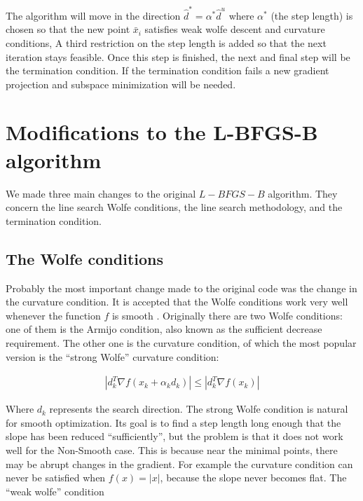 The algorithm will move in the direction $\hat{d}^* = \alpha^* \hat{d}^u$ where $\alpha^*$ (the step length) is chosen so that the new point $\bar{x}_i$ satisfies weak wolfe descent and curvature conditions, A third restriction on the step length is added so that the next iteration stays feasible. Once this step is finished, the next and final step will be the termination condition. If the termination condition fails a new gradient projection and subspace minimization will be needed.

\chapter{Modifications to the L-BFGS-B algorithm}

We made three main changes to the original $L-BFGS-B$ algorithm. They concern the line search Wolfe conditions, the line search methodology, and the termination condition.

\section{The Wolfe conditions}

Probably the most important change made to the original code was the change in the curvature condition. It is accepted that the Wolfe conditions work very well whenever the function $f$ is smooth \citep{MR1855221}. Originally there are two Wolfe conditions: one of them is the Armijo condition, also known as the sufficient decrease requirement. The other one is the curvature condition, of which the most popular version is the ``strong Wolfe'' curvature condition:

\begin{equation}
  \begin{aligned}
    |d_k^T \nabla f(x_k + \alpha _k d_k)| \leq |d_k^T \nabla f(x_k)|
  \end{aligned}
\end{equation}

Where $d_k$ represents the search direction. The strong Wolfe condition is natural for smooth optimization. Its goal is to find a step length long enough that the slope has been reduced ``sufficiently'', but the problem is that it does not work well for the Non-Smooth case. This is because near the minimal points, there may be abrupt changes in the gradient. For example the curvature condition can never be satisfied when $f(x) = |x|$, because the slope never becomes flat. The ``weak wolfe'' condition

